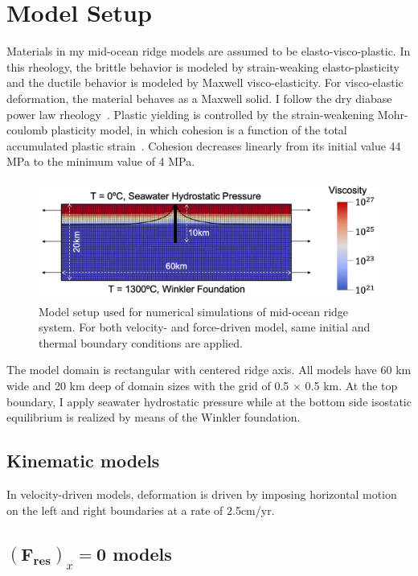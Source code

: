 \documentclass[letterpaper,12pt,notitle]{memphisthesis}                     %
\begin{document}
\section{Model Setup}
Materials in my mid-ocean ridge models are assumed to be elasto-visco-plastic. In this rheology, the brittle behavior is modeled by strain-weaking elasto-plasticity and the ductile behavior is modeled by Maxwell visco-elasticity. For visco-elastic deformation, the material behaves as a Maxwell solid. I follow the dry diabase power law rheology~\citep{Kirby1987, Chen1990}. Plastic yielding is controlled by the strain-weakening Mohr-coulomb plasticity model, in which cohesion is a function of the total accumulated plastic strain~\citep{Poliakov1998}. Cohesion decreases linearly from its initial value 44 MPa to the minimum value of 4 MPa.
%
\begin{figure}[!htb]
	\centering
	\includegraphics[width=0.8\linewidth]{./figs/modelsetup.png}
	\caption{Model setup used for numerical simulations of mid-ocean ridge system. For both velocity- and force-driven model, same initial and thermal boundary conditions are applied.}
	\label{fig:modelsetup}
\end{figure}
%

The model domain is rectangular with centered ridge axis. All models have 60 km wide and 20 km deep of domain sizes with the grid of 0.5 $\times$ 0.5 km. At the top boundary, I apply seawater hydrostatic pressure while at the bottom side isostatic equilibrium is realized by means of the Winkler foundation.

\subsection{Kinematic models}

In velocity-driven models, deformation is driven by imposing horizontal motion on the left and right boundaries at a rate of 2.5cm/yr. 

\subsection{$(\boldsymbol{F_{res}})_x \mathbf{=0}$ models}
\end{document}
